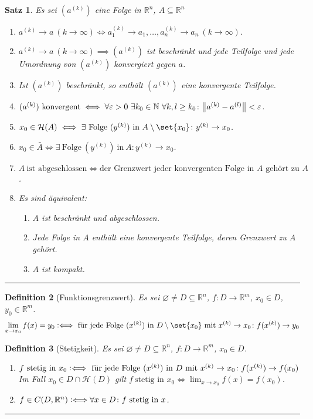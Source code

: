 \documentclass[a4paper]{article}
\newcounter{Sec}
\theoremstyle{marginbreak}
\newtheorem{definition}{Definition}[Sec]
\newtheorem{satz}[definition]{Satz}
\newcommand{\sep}{%
	\rule{\textwidth}{0.3pt}%
	\stepcounter{Sec}%
	}
\newcommand{\defiff}{\mathrel{\vcentcolon\Longleftrightarrow}}
\begin{document}
	\begin{satz}
		Es sei $(a^{(k)})$ eine Folge in $\mathbb{R}^n$, $A\subseteq\mathbb{R}^n$
		\begin{enumerate}[label=(\alph*)]
			\item $a^{(k)}\to a\ (k\to\infty)\iff a_1^{(k)}\to a_1,\ldots,a_n^{(k)}\to a_n\ (k\to\infty)$.
			\item $a^{(k)}\to a\ (k\to\infty)\implies (a^{(k)})$ ist beschränkt und jede Teilfolge und jede Umordnung
				von $(a^{(k)})$ konvergiert gegen $a$.
			\item Ist $(a^{(k)})$ beschränkt, so enthält $(a^{(k)})$ eine konvergente Teilfolge.
			\item $(a^{(k)})\ \text{konvergent}\iff\forall\varepsilon>0\ \exists k_0\in\mathbb{N}\ \forall k, l\geq k_0\colon
				\norm{a^{(k)} - a^{(l)}}<\varepsilon$.
			\item $x_0\in\mathcal{H}(A) \iff\exists\ \text{Folge}\ (y^{(k)})\ \text{in}\ A\setminus\set{x_0}\colon y^{(k)}\to x_0$.
			\item $x_0\in\bar{A}\iff\exists\ \text{Folge}\ (y^{(k)})\ \text{in}\ A\colon y^{(k)}\to x_0$.
			\item $A\ \text{ist abgeschlossen} \iff \text{der Grenzwert jeder konvergenten Folge in $A$ gehört zu $A$}$.
			\item Es sind äquivalent:
				\begin{enumerate}[label=(\roman*)]
					\item $A$ ist beschränkt und abgeschlossen.
					\item Jede Folge in $A$ enthält eine konvergente Teilfolge, deren Grenzwert zu $A$ gehört.
					\item $A$ ist kompakt.
				\end{enumerate}
		\end{enumerate}
	\end{satz}
	\sep
	\begin{definition}[Funktionsgrenzwert]
		Es sei $\varnothing\neq D\subseteq\mathbb{R}^n$, $f\colon D\to\mathbb{R}^m$, $x_0\in D$, $y_0\in\mathbb{R}^m$.
		\[\lim_{x\to x_0}f(x) = y_0\defiff\ \text{für jede Folge $(x^{(k)})$ in $D\setminus\set{x_0}$ mit $x^{(k)}\to x_0$}\colon
		f(x^{(k)})\to y_0\]
	\end{definition}
	\begin{definition}[Stetigkeit]
		Es sei $\varnothing\neq D\subseteq\mathbb{R}^n$, $f\colon D\to\mathbb{R}^m$, $x_0\in D$.
		\begin{enumerate}[label=(\alph*)]
			\item
				$f\ \text{stetig in $x_0$}\defiff\ \text{für jede Folge $(x^{(k)})$ in $D$ mit $x^{(k)}\to x_0$}\colon f(x^{(k)})\to f(x_0)$
				Im Fall $x_0\in D\cap\mathcal{H}(D)$ gilt $f\ \text{stetig in $x_0$}\iff \lim_{x\to x_0} f(x) = f(x_0)$.
			\item $f\in C(D, \mathbb{R}^n)\defiff\forall x\in D\colon f\ \text{stetig in $x$}$.
		\end{enumerate}
	\end{definition}
	\sep
\end{document}
